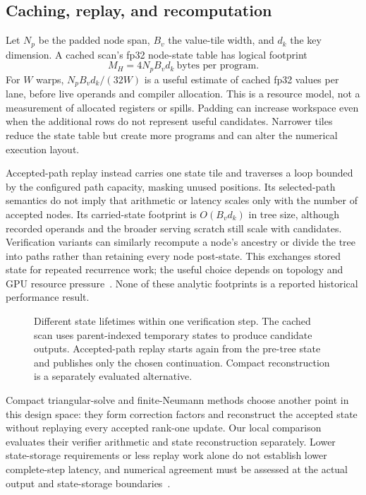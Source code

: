 \documentclass[conference]{IEEEtran}
\begin{document}
\subsection{Caching, replay, and recomputation}
Let $N_p$ be the padded node span, $B_v$ the value-tile width, and $d_k$ the key dimension. A cached scan's fp32 node-state table has logical footprint
\begin{equation}
 M_H = 4N_pB_vd_k\ \text{bytes per program}.
\end{equation}
For $W$ warps, $N_pB_vd_k/(32W)$ is a useful estimate of cached fp32 values per lane, before live operands and compiler allocation. This is a resource model, not a measurement of allocated registers or spills. Padding can increase workspace even when the additional rows do not represent useful candidates. Narrower tiles reduce the state table but create more programs and can alter the numerical execution layout.

Accepted-path replay instead carries one state tile and traverses a loop bounded by the configured path capacity, masking unused positions. Its selected-path semantics do not imply that arithmetic or latency scales only with the number of accepted nodes. Its carried-state footprint is $O(B_vd_k)$ in tree size, although recorded operands and the broader serving scratch still scale with candidates. Verification variants can similarly recompute a node's ancestry or divide the tree into paths rather than retaining every node post-state. This exchanges stored state for repeated recurrence work; the useful choice depends on topology and GPU resource pressure~\cite{lumo2026archive}. None of these analytic footprints is a reported historical performance result.

\begin{figure}[t]
\centering

\caption{Different state lifetimes within one verification step. The cached scan uses parent-indexed temporary states to produce candidate outputs. Accepted-path replay starts again from the pre-tree state and publishes only the chosen continuation. Compact reconstruction is a separately evaluated alternative.}
\label{fig:scan-replay}
\end{figure}

Compact triangular-solve and finite-Neumann methods choose another point in this design space: they form correction factors and reconstruct the accepted state without replaying every accepted rank-one update. Our local comparison evaluates their verifier arithmetic and state reconstruction separately. Lower state-storage requirements or less replay work alone do not establish lower complete-step latency, and numerical agreement must be assessed at the actual output and state-storage boundaries~\cite{ghantasala2026treewy,wang2026bole}.
\end{document}
